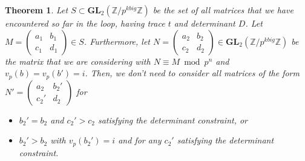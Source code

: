 \documentclass[letterpaper,12pt]{article}
\newtheorem{Theorem}{Theorem}
\newcommand{\Z}{\mathbb{Z}}
\newcommand{\GL}{\mathbf {GL}}
\begin{document}
\begin{Theorem}
Let $S \subset \GL_2(\Z / p^{kbig}\Z)$ be the set of all matrices that we have encountered so far in the loop, 
having trace $t$ and determinant $D$. 
Let $M = \begin{pmatrix} a_1 & b_1 \\ c_1 & d_1 \end{pmatrix} \in S$.
Furthermore, let $N = \begin{pmatrix} a_2 & b_2 \\ c_2 & d_2 \end{pmatrix} \in \GL_2(\Z / p^{kbig}\Z)$ 
be the matrix that we are considering
with $N \equiv M \bmod p^n$ and $v_p(b) = v_p(b') = i$.
Then, we don't need to consider all matrices of the form 
$N' = \begin{pmatrix} a_2 & b_2' \\ c_2' & d_2 \end{pmatrix}$ for 
\begin{itemize}
\item $b_2' = b_2$ and $c_2' > c_2$ satisfying the determinant constraint, or
\item $b_2' > b_2$ with $v_p(b_2') = i$ and for any $c_2'$ satisfying the determinant constraint.
\end{itemize}
\end{Theorem}

\
\end{document}
